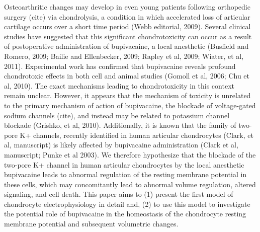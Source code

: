 Osteoarthritic changes may develop in even young patients following
orthopedic surgery (cite) via chondrolysis, a condition in which
accelerated loss of articular cartilage occurs over a short time
period (Webb editorial, 2009).  Several clinical studies have
suggested that this significant chondrotoxicity can occur as a result
of postoperative administration of bupivacaine, a local anesthetic
(Busfield and Romero, 2009; Bailie and Ellenbecker, 2009; Rapley et
al, 2009; Wiater, et al, 2011).  Experimental work has confirmed that
bupivacaine reveals profound chondrotoxic effects in both cell
\citep{Chuetal2006} and animal studies (Gomoll et al, 2006; Chu et al,
2010).  The exact mechanisms leading to chondrotoxicity in this
context remain unclear.  However, it appears that the mechanism of
toxicity is unrelated to the primary mechanism of action of
bupivacaine, the blockade of voltage-gated sodium channels (cite), and
instead may be related to potassium channel blockade (Grishko, et al,
2010).  Additionally, it is known that the family of two-pore K+
channels, recently identified in human articular chondrocytes (Clark,
et al, manuscript) is likely affected by bupivacaine administration
(Clark et al, manuscript; Punke et al 2003).  We therefore hypothesize
that the blockade of the two-pore K+ channel in human articular
chondrocytes by the local anesthetic bupivacaine leads to abnormal
regulation of the resting membrane potential in these cells, which may
concomitantly lead to abnormal volume regulation, altered signaling,
and cell death.  This paper aims to (1) present the first model of
chondrocyte electrophysiology in detail and, (2) to use this model to
investigate the potential role of bupivacaine in the homeostasis of
the chondrocyte resting membrane potential and subsequent volumetric
changes.

